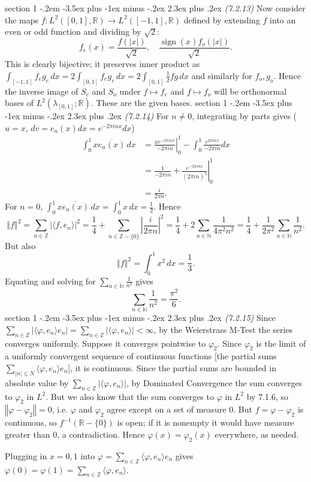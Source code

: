 \documentclass[12pt]{article}
\makeatletter
\theoremstyle{norm}
\newcommand{\N}[0]{\mathbb{N}}
\newcommand{\R}[0]{\mathbb{R}}
\newcommand{\Z}[0]{\mathbb{Z}}
\newcommand{\rc}[1]{\frac{1}{#1}}
\newcommand{\la}[0]{\lambda}
\newcommand{\ph}[0]{\varphi}
\newcommand{\ab}[1]{\left| {#1} \right|}
\newcommand{\an}[1]{\langle {#1}\rangle}
\newcommand{\ve}[1]{\left\Vert {#1}\right\Vert}
\newcommand{\sign}{\operatorname{sign}}
\newcommand{\ol}[1]{\overline{#1}}
\newcommand{\iy}[0]{\infty}
\newenvironment{problem}{\@startsection
       {section}
       {1}
       {-.2em}
       {-3.5ex plus -1ex minus -.2ex}
       {2.3ex plus .2ex}
       {\pagebreak[3]%
       \large\bf\noindent{Problem }
       }
       }
       {%
       }
\makeatother
\begin{document}
\begin{problem}{\it (7.2.13)}
Now consider the maps $f:L^2([0,1],\R)\to L^2([-1,1],\R)$ defined by extending $f$ into an even or odd function and dividing by $\sqrt2$:\[f_e(x)=\frac{f(|x|)}{\sqrt 2},\quad \frac{\sign(x)f_o(|x|)}{\sqrt 2}.\]
This is clearly bijective; it preserves inner product as $\int_{[-1,1]} f_eg_e\,dx=2\int_{[0,1]} f_eg_e\,dx=2\int_{[0,1]}\rc 2fg\,dx$ and similarly for $f_o,g_o$. Hence the inverse image of $S_e$ and $S_o$ under $f\mapsto f_e$ and $f\mapsto f_o$ will be orthonormal bases of $L^2(\la_{[0,1]};\R)$. These are the given bases.
\end{problem}
\begin{problem}{\it(7.2.14)}
For $n\neq 0$, integrating by parts gives ($u=x,\,dv=e_n(x)dx=e^{-2\pi i nx}dx$)
\begin{align*}
\int_0^1 x\ol{e_n(x)}\,dx&=\left.\frac{xe^{-2\pi i nx}}{-2\pi in}\right|^1_0-\int_0^1 \frac{e^{2\pi inx}}{-2\pi i n}dx\\
&=\rc{-2\pi i n}+\left .\frac{e^{-2\pi inx}}{(2\pi i n)^2}\right|^1_0\\
&=\frac{i}{2\pi n}.
\end{align*}
For $n=0$, $\int_0^1 x\ol{e_n(x)}\,dx=\int_0^1x\,dx=\rc 2$. Hence %
\[
\ve{f}^2=\sum_{n\in \Z} \ab{\an{f,e_n}}^2=\rc{4}+\sum_{n\in \Z-\{0\}}\ab{\frac{i}{2\pi n}}^2=\rc{4}+2\sum_{n\in \N}\rc{4\pi^2 n^2}
=\rc{4}+\frac{1}{2\pi^2}\sum_{n\in \N}\rc{n^2}.
\]
But also
\[
\ve{f}^2=\int_0^1 x^2\,dx=\rc 3.
\]
Equating and solving for $\sum_{n\in \N}\rc{n^2}$ gives
\[
\sum_{n\in \N}\rc{n^2}=\frac{\pi^2}{6}.
\]
\end{problem}
\begin{problem}{\it(7.2.15)}
Since $\sum_{n\in \Z} |\an{\ph,e_n}e_n|=\sum_{n\in \Z}|\an{\ph,e_n}|<\iy$, by the Weierstrass M-Test the series converges uniformly. Suppose it converges pointwise to $\ph_2$. Since $\ph_2$ is the limit of a uniformly convergent sequence of continuous functions [the partial sums $\sum_{|n|\le N}\an{\ph,e_n}e_n$], it is continuous. Since the partial sums are bounded in absolute value by $\sum_{n\in \Z}|\an{\ph,e_n}|$, by Dominated Convergence the sum converges to $\ph_2$ in $L^2$. But we also know that the sum converges to $\ph$ in $L^2$ by 7.1.6, so $\ve{\ph-\ph_2}=0$, i.e. $\ph$ and $\ph_2$ agree except on a set of measure 0. But $f=\ph-\ph_2$ is continuous, so $f^{-1}(\R-\{0\})$ is open; if it is nonempty it would have measure greater than 0, a contradiction. Hence $\ph(x)=\ph_2(x)$ everywhere, as needed.

Plugging in $x=0,1$ into $\ph=\sum_{n\in \Z}\an{\ph,e_n}e_n$ 
gives $\ph(0)=\ph(1)=\sum_{n\in \Z} \an{\ph,e_n}$.
\end{problem}
\end{document}
